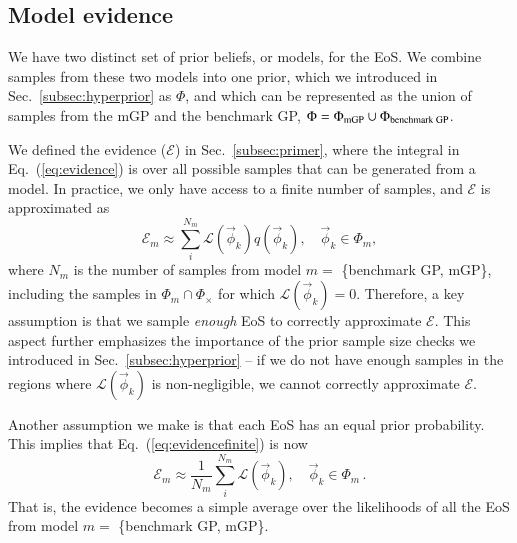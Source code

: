 \documentclass[aps,prd,nofootinbib,tightenlines,notitlepage,floatfix,superscriptaddress,showkeys,twocolumn]{revtex4-1}
\begin{document}
\subsection{Model evidence}\label{subsec:model_evidence}

We have two distinct set of prior beliefs, or models, for the EoS. We combine samples from these two models into one prior, which we introduced in Sec.~\ref{subsec:hyperprior} as $\Phi$, and which can be represented as the union of samples from the mGP and the benchmark GP, $\Phi = \Phi_{\rm mGP} \cup \Phi_\textrm{benchmark GP}$.

We defined the evidence ($\mathcal{E}$) in Sec.~\ref{subsec:primer}, where the integral in Eq.~(\ref{eq:evidence}) is over all possible samples that can be generated from a model. In practice, we only have access to a finite number of samples, and $\mathcal{E}$ is approximated as
\begin{equation}\label{eq:evidencefinite}
    \mathcal{E}_m \approx \sum_i^{N_{m}}\mathcal{L}(\vec{\phi}_k)q(\vec{\phi}_k), \quad \vec{\phi}_k\in \Phi_{m},
\end{equation}
where $N_{m}$ is the number of samples from model $m=$ \{benchmark GP, mGP\}, including the samples in $\Phi_m\cap\Phi_\times$ for which $\mathcal{L}(\vec{\phi}_k) = 0$. Therefore, a key assumption is that we sample \emph{enough} EoS to correctly approximate $\mathcal{E}$. This aspect further emphasizes the importance of the prior sample size checks we introduced in Sec.~\ref{subsec:hyperprior} -- if we do not have enough samples in the regions where $\mathcal{L}(\vec{\phi}_k)$ is non-negligible, we cannot correctly approximate $\mathcal{E}$. 

Another assumption we make is that each EoS has an equal prior probability. This implies that Eq.~(\ref{eq:evidencefinite}) is now
\begin{equation}
    \mathcal{E}_m \approx \dfrac{1}{N_{m}}\sum_i^{N_{m}}\mathcal{L}(\vec{\phi}_k), \quad \vec{\phi}_k\in \Phi_{m}\,.
\end{equation}
That is, the evidence becomes a simple average over the likelihoods of all the EoS from model $m =$ \{benchmark GP, mGP\}. 
\end{document}
